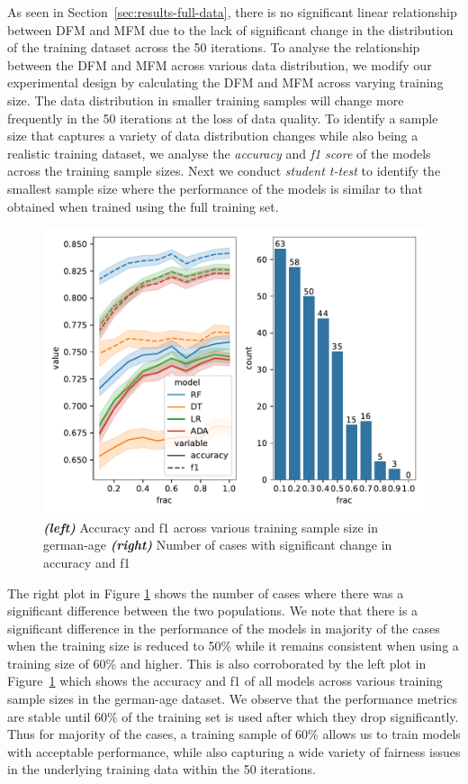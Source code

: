\documentclass{article}
\begin{document}
As seen in Section \ref{sec:results-full-data}, there is no
significant linear relationship between DFM and MFM due to the lack of
significant change in the distribution of the training dataset across
the 50 iterations. To analyse the relationship between the DFM and MFM
across various data distribution, we modify our experimental design by
calculating the DFM and MFM across varying training size. The data
distribution in smaller training samples will change more frequently
in the 50 iterations at the loss of data quality. To identify a sample
size that captures a variety of data distribution changes while also
being a realistic training dataset, we analyse the \emph{accuracy} and
\emph{f1 score} of the models across the training sample sizes. Next
we conduct \emph{student t-test} to identify the smallest sample size
where the performance of the models is similar to that obtained when
trained using the full training set.

\begin{figure}
  \centering
  \includegraphics[width=0.95\linewidth]{training-set-frac-threshold.pdf}
  \caption{\emph{\textbf{(left)}} Accuracy and f1 across various
    training sample size in german-age \emph{\textbf{(right)}} Number
    of cases with significant change in accuracy and f1}
  \label{fig:training-set-frac-threshold}
\end{figure}

The right plot in Figure \ref{fig:training-set-frac-threshold} shows
the number of cases where there was a significant difference between
the two populations. We note that there is a significant difference in
the performance of the models in majority of the cases when the
training size is reduced to 50\% while it remains consistent when
using a training size of 60\% and higher. This is also corroborated by
the left plot in Figure \ref{fig:training-set-frac-threshold} which
shows the accuracy and f1 of all models across various training sample
sizes in the german-age dataset. We observe that the performance
metrics are stable until 60\% of the training set is used after which
they drop significantly. Thus for majority of the cases, a training
sample of 60\% allows us to train models with acceptable performance,
while also capturing a wide variety of fairness issues in the
underlying training data within the 50 iterations.
\end{document}
